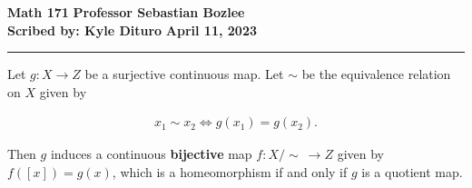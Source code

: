 \documentclass[12pt, twosided]{article}
\begin{document}
\noindent \textbf{Math 171} \hfill \textbf{Professor Sebastian Bozlee} \\
\textbf{Scribed by: Kyle Dituro} \hfill \textbf{April 11, 2023}\hrule
\vspace{.2in}

\begin{cor}
  Let \(g: X \to Z\) be a surjective continuous map.
  Let \(\sim\) be the equivalence relation on \(X\) given by

  \begin{align*}
    x_1 \sim x_2 \Longleftrightarrow g(x_1) = g(x_2).
  \end{align*}

  Then \(g\) induces a continuous \textbf{bijective} map \(f: X/\sim\ \to Z\) given by \(f([x]) = g(x)\), which is a homeomorphism if and only if \(g\) is a quotient map.

  \begin{center}
  \end{center}
\end{cor}
\end{document}
